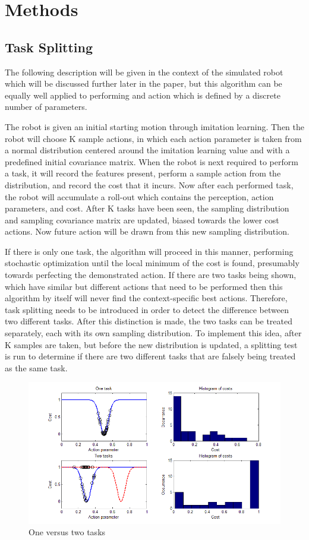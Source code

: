 \documentclass[12pt]{article}
\begin{document}
\section{Methods}

\subsection{Task Splitting}
The following description will be given in the context of the simulated robot which will be discussed further later in the paper, but this algorithm can be equally well applied to performing and action which is defined by a discrete number of parameters. 

The robot is given an initial starting motion through imitation learning. Then the robot will choose K sample actions, in which each action parameter is taken from a normal distribution centered around the imitation learning value and with a predefined initial covariance matrix. When the robot is next required to perform a task, it will record the features present, perform a sample action from the distribution, and record the cost that it incurs. Now after each performed task, the robot will accumulate a roll-out which contains the perception, action parameters, and cost. After K tasks have been seen, the sampling distribution and sampling covariance matrix are updated, biased towards the lower cost actions. Now future action will be drawn from this new sampling distribution. 

If there is only one task, the algorithm will proceed in this manner, performing stochastic optimization until the local minimum of the cost is found, presumably towards perfecting the demonstrated action. If there are two tasks being shown, which have similar but different actions that need to be performed then this algorithm by itself will never find the context-specific best actions. Therefore, task splitting needs to be introduced in order to detect the difference between two different tasks. After this distinction is made, the two tasks can be treated separately, each with its own sampling distribution. To implement this idea, after K samples are taken, but before the new distribution is updated, a splitting test is run to determine if there are two different tasks that are falsely being treated as the same task.

\begin{figure}[ht]
  \centering
  \includegraphics[width=0.9\columnwidth]{one_vs_two_tasks.png}
  \caption{One versus two tasks}
  \label{fig:1vs2tasks}
\end{figure} 
\end{document}
